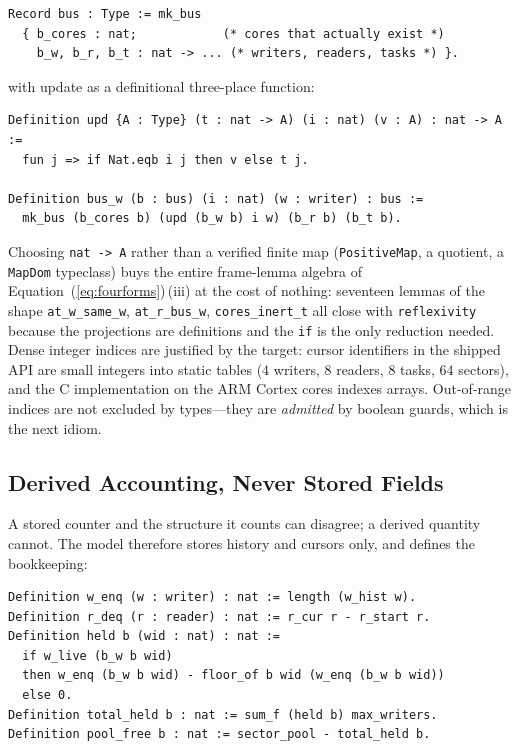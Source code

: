 \documentclass[10pt,journal,compsoc,twocolumn]{article}
\theoremstyle{definition}
\theoremstyle{remark}
\theoremstyle{plain}
\newcommand{\ctr}[1]{\texttt{#1}}
\begin{document}
\begin{lstlisting}[language=Coq,basicstyle=\ttfamily\scriptsize,frame=none]
Record bus : Type := mk_bus
  { b_cores : nat;            (* cores that actually exist *)
    b_w, b_r, b_t : nat -> ... (* writers, readers, tasks *) }.
\end{lstlisting}

with update as a definitional three-place function:

\begin{lstlisting}[language=Coq]
Definition upd {A : Type} (t : nat -> A) (i : nat) (v : A) : nat -> A :=
  fun j => if Nat.eqb i j then v else t j.

Definition bus_w (b : bus) (i : nat) (w : writer) : bus :=
  mk_bus (b_cores b) (upd (b_w b) i w) (b_r b) (b_t b).
\end{lstlisting}

Choosing \ctr{nat -> A} rather than a verified finite map (\ctr{PositiveMap}, a quotient, a \ctr{MapDom} typeclass) buys the entire frame-lemma algebra of Equation~(\ref{eq:fourforms})\,(iii) at the cost of nothing: seventeen lemmas of the shape \ctr{at\_w\_same\_w}, \ctr{at\_r\_bus\_w}, \ctr{cores\_inert\_t} all close with \ctr{reflexivity} because the projections are definitions and the \ctr{if} is the only reduction needed. Dense integer indices are justified by the target: cursor identifiers in the shipped API are small integers into static tables (\(4\) writers, \(8\) readers, \(8\) tasks, \(64\) sectors), and the C implementation on the ARM Cortex cores indexes arrays. Out-of-range indices are not excluded by types---they are \emph{admitted} by boolean guards, which is the next idiom.

\subsection{Derived Accounting, Never Stored Fields}
\label{sec:derived}
A stored counter and the structure it counts can disagree; a derived quantity cannot. The model therefore stores history and cursors only, and defines the bookkeeping:

\begin{lstlisting}[language=Coq]
Definition w_enq (w : writer) : nat := length (w_hist w).
Definition r_deq (r : reader) : nat := r_cur r - r_start r.
Definition held b (wid : nat) : nat :=
  if w_live (b_w b wid)
  then w_enq (b_w b wid) - floor_of b wid (w_enq (b_w b wid))
  else 0.
Definition total_held b : nat := sum_f (held b) max_writers.
Definition pool_free b : nat := sector_pool - total_held b.
\end{lstlisting}
\end{document}
